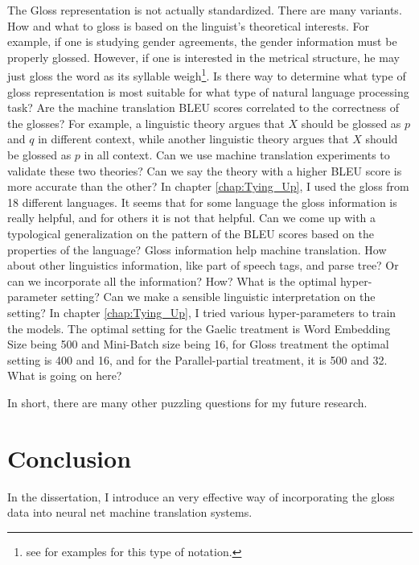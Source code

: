 \documentclass[final]{ua-thesis}
\numberwithin{equation}{section}
\begin{document}
\begin{exe}
\ex
	\begin{xlist}
	\ex The Gloss representation is not actually standardized. There are many variants. How and what to gloss is based on the linguist's theoretical interests. For example, if one is studying gender agreements, the gender information must be properly glossed. However, if one is interested in the metrical structure, he may just gloss the word as its syllable weigh\footnote{see \citet{Mohsen} for examples for this type of notation.}. Is there way to determine what type of gloss representation is most suitable for what type of natural language processing task?
	\ex Are the machine translation BLEU scores correlated to the correctness of the glosses? For example, a linguistic theory argues that $X$ should be glossed as $p$ and $q$ in different context, while another linguistic theory argues that $X$ should be glossed as $p$ in all context. Can we use machine translation experiments to validate these two theories? Can we say the theory with a higher BLEU score is more accurate than the other? 
	\ex In chapter \ref{chap:Tying_Up}, I used the gloss from 18 different languages. It seems that for some language the gloss information is really helpful, and for others it is not that helpful. Can we come up with a typological generalization on the pattern of the BLEU scores based on the properties of the language?  
	\ex Gloss information help machine translation. How about other linguistics information, like part of speech tags, and parse tree? Or can we incorporate all the information? How? 
	\ex What is the optimal hyper-parameter setting? Can we make a sensible linguistic interpretation on the setting? In chapter \ref{chap:Tying_Up}, I tried various hyper-parameters to train the models. The optimal setting for the Gaelic treatment is Word Embedding Size being 500 and Mini-Batch size being 16, for Gloss treatment the optimal setting is 400 and 16, and for the Parallel-partial treatment, it is 500 and 32. What is going on here?    
	\end{xlist}
\end{exe}

In short, there are many other puzzling questions for my future research. 

\section{Conclusion}

In the dissertation, I introduce an very effective way of incorporating the gloss data into neural net machine translation systems.
\end{document}
